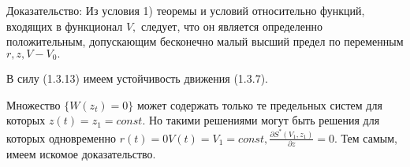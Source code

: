 Доказательство:
Из условия 1) теоремы и условий относительно функций, входящих в функционал $V,$ следует, что он является определенно положительным, допускающим бесконечно малый высший предел по переменным $r, z, V - V_0.$

В силу (1.3.13) имеем устойчивость движения (1.3.7).

Множество $\lbrace W(z_t) = 0 \rbrace$ может содержать только те предельных систем для которых $z(t) = z_1 = const.$ Но такими решениями могут быть решения для которых одновременно $r(t) = 0 V(t) = V_1 = const, \frac{\partial S^{*} (V_1, z_1)}{\partial z} = 0.$ Тем самым, имеем искомое доказательство. 
